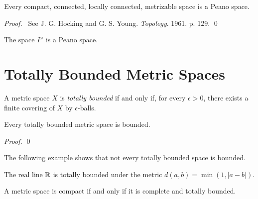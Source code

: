 \begin{theorem}
    Every compact, connected, locally connected, metrizable space is a Peano space.
\end{theorem}

\begin{proof}
    \pf\ See J. G. Hocking and G. S. Young. \emph{Topology}. 1961. p. 129. \qed
\end{proof}

\begin{corollary}
    The space $I^\omega$ is a Peano space.
\end{corollary}

\section{Totally Bounded Metric Spaces}

\begin{definition}
    A metric space $X$ is \emph{totally bounded} if and only if, for every $\epsilon > 0$, there exists a finite covering of $X$
    by $\epsilon$-balls.
\end{definition}

\begin{proposition}
    Every totally bounded metric space is bounded.
\end{proposition}

\begin{proof}
    \pf
    \qed
\end{proof}

The following example shows that not every totally bounded space is bounded.

\begin{proposition}
    The real line $\mathbb{R}$ is totally bounded under the metric $d(a,b) = \min(1,|a-b|)$.
\end{proposition}

\begin{theorem}[Choice]
    \label{theorem:compact_complete_totally_bounded}
    A metric space is compact if and only if it is complete and totally bounded.
\end{theorem}

